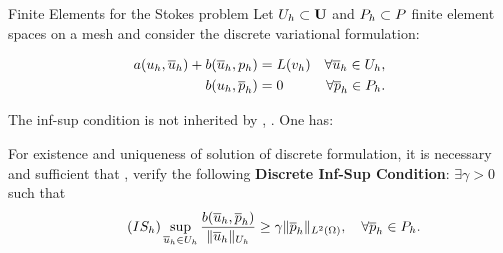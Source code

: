 \SetDefaultBackground
\begin{frame}{Finite Elements for the Stokes problem}
  Let $U_h\subset \mathbf{U}$ and $P_h\subset P$ finite element spaces on a mesh \Th
  and consider the \alert{discrete variational formulation}:
  \begin{BlockNoTitle}
    \vspace{-1em}
    \begin{align*}
      a(u_{h},\overline{u}_h) + b(\overline{u}_h,p_{h}) &= L(v_{h}) & \forall \overline{u}_h\in U_h,
      \\
      b(u_{h},\overline{p}_h) &=0 & \forall \overline{p}_h \in P_h.
    \end{align*}
  \end{BlockNoTitle}

  The  inf-sup condition is not inherited by \Uh, \Ph. One has:

  \begin{theorem}
    For \alert{existence and uniqueness} of solution of discrete
    formulation, it is necessary and sufficient that \Uh, \Ph verify
    the following \alert{\textbf{Discrete Inf-Sup Condition}}: $\exists \gamma>0$ such that
    \begin{equation}
      \tag{\ensuremath{IS_h}}
      \sup_{\buh\in\Uh}\frac{b(\buh,\bph)}{\norm[\Uh]{\buh}} \ge \gamma \norm[L^2(\Omega)]{\bph}, \quad \forall \bph\in \Ph.
      \label{eq:stokes:ISh}
    \end{equation}
  \end{theorem}
\end{frame}

